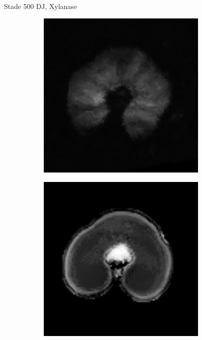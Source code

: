 \documentclass[10pt]{beamer}
\begin{document}
\begin{frame}{Stade 500 DJ, Xylanase}
  \begin{figure}[ht]
    \centering
    \begin{subfigure}[t]{0.33\textwidth}
      \centering
      \includegraphics[width=0.9\textwidth]{fig/stats_500Xyl_t2}
    \end{subfigure}%
    \begin{subfigure}[t]{0.33\textwidth}
      \centering
      \includegraphics[width=0.9\textwidth]{fig/stats_500Xyl_t2_irm}
    \end{subfigure}%
    
  \end{figure}
\end{frame}
\end{document}

